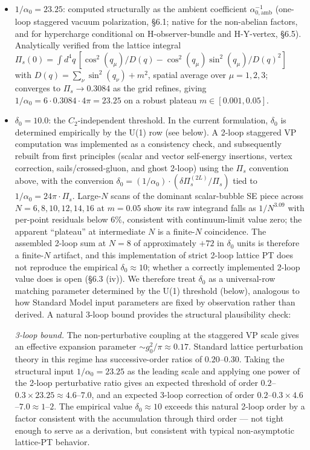 \documentclass[
]{article}
\begin{document}
\begin{itemize}
\item
  \(1/\alpha_0 = 23.25\): computed structurally as the ambient
  coefficient \(\alpha^{-1}_{0,\mathrm{amb}}\) (one-loop staggered
  vacuum polarization, §6.1; native for the non-abelian factors, and for
  hypercharge conditional on H-observer-bundle and H-Y-vertex, §6.5).
  Analytically verified from the lattice integral
  \(\Pi_s(0) = \int d^4q\,[\cos^2(q_\mu)/D(q) - \cos^2(q_\mu)\sin^2(q_\mu)/D(q)^2]\)
  with \(D(q) = \sum_\nu \sin^2(q_\nu) + m^2\), spatial average over
  \(\mu = 1, 2, 3\); converges to \(\Pi_s \to 0.3084\) as the grid
  refines, giving \(1/\alpha_0 = 6 \cdot 0.3084 \cdot 4\pi = 23.25\) on
  a robust plateau \(m \in [0.001, 0.05]\).
\item
  \(\delta_0 = 10.0\): the \(C_2\)-independent threshold. In the current
  formulation, \(\delta_0\) is determined empirically by the U(1) row
  (see below). A 2-loop staggered VP computation was implemented as a
  consistency check, and subsequently rebuilt from first principles
  (scalar and vector self-energy insertions, vertex correction,
  sails/crossed-gluon, and ghost 2-loop) using the \(\Pi_s\) convention
  above, with the conversion
  \(\delta_0 = (1/\alpha_0) \cdot (\delta\Pi_s^{(2L)}/\Pi_s)\) tied to
  \(1/\alpha_0 = 24\pi \cdot \Pi_s\). Large-\(N\) scans of the dominant
  scalar-bubble SE piece across \(N = 6, 8, 10, 12, 14, 16\) at
  \(m = 0.05\) show its raw integrand falls as \(1/N^{3.09}\) with
  per-point residuals below \(6\%\), consistent with continuum-limit
  value zero; the apparent ``plateau'' at intermediate \(N\) is a
  finite-\(N\) coincidence. The assembled 2-loop sum at \(N = 8\) of
  approximately \(+72\) in \(\delta_0\) units is therefore a
  finite-\(N\) artifact, and this implementation of strict 2-loop
  lattice PT does not reproduce the empirical \(\delta_0 \approx 10\);
  whether a correctly implemented 2-loop value does is open (§6.3 (iv)).
  We therefore treat \(\delta_0\) as a universal-row matching parameter
  determined by the U(1) threshold (below), analogous to how Standard
  Model input parameters are fixed by observation rather than derived. A
  natural 3-loop bound provides the structural plausibility check:

  \emph{3-loop bound.} The non-perturbative coupling at the staggered VP
  scale gives an effective expansion parameter
  \(\sim g_0^2/\pi \approx 0.17\). Standard lattice perturbation theory
  in this regime has successive-order ratios of \(0.20\)--\(0.30\).
  Taking the structural input \(1/\alpha_0 = 23.25\) as the leading
  scale and applying one power of the 2-loop perturbative ratio gives an
  expected threshold of order
  \(0.2\)--\(0.3 \times 23.25 \approx 4.6\)--\(7.0\), and an expected
  3-loop correction of order
  \(0.2\)--\(0.3 \times 4.6\)--\(7.0 \approx 1\)--\(2\). The empirical
  value \(\delta_0 \approx 10\) exceeds this natural 2-loop order by a
  factor consistent with the accumulation through third order --- not
  tight enough to serve as a derivation, but consistent with typical
  non-asymptotic lattice-PT behavior.


\end{itemize}
\end{document}
